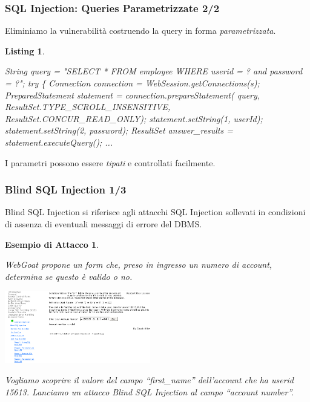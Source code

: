 \documentclass{beamer}
\newtheorem{myexample}{Esempio di Attacco}
\newtheorem{codice}{Listing}
\begin{document}
\begin{frame}[fragile]
  \frametitle{SQL Injection: Queries Parametrizzate 2/2}
  Eliminiamo la vulnerabilit\`a costruendo la query in forma \emph{parametrizzata}.
  \begin{tiny}
    \begin{codice}
      \begin{semiverbatim}
String query = "SELECT * FROM employee WHERE userid = ? 
                                         and password = ?";
try
\{
  Connection connection = WebSession.getConnections(s);
  PreparedStatement statement = connection.prepareStatement(
                                query,
                                ResultSet.TYPE_SCROLL_INSENSITIVE,
                                ResultSet.CONCUR_READ_ONLY);
  statement.setString(1, userId);
  statement.setString(2, password);
  ResultSet answer_results = statement.executeQuery();
  ...
      \end{semiverbatim}
    \end{codice}
  \end{tiny}
  I parametri possono essere \emph{tipati} e controllati facilmente.
\end{frame}

\begin{frame}
  \frametitle{Blind SQL Injection 1/3}
  Blind SQL Injection si riferisce agli attacchi SQL Injection sollevati in condizioni di assenza di eventuali messaggi di errore del DBMS.
  \pause
  \begin{myexample}
    \begin{tiny}
      WebGoat propone un form che, preso in ingresso un numero di account, determina se questo \`e valido o no. 
      \begin{center}
	\includegraphics[width=180pt]{images/sql_injection_blind_1.png}
      \end{center}
      Vogliamo scoprire il valore del campo ``first\_name'' dell'account che ha userid 15613. 
      \newline Lanciamo un attacco Blind SQL Injection al campo ``account number''.
    \end{tiny}
  \end{myexample}
\end{frame}
\end{document}
